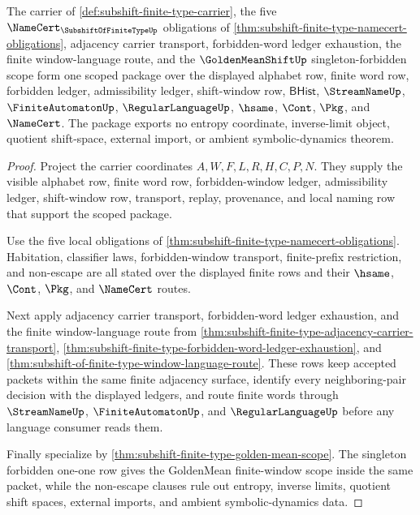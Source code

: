 \begin{theorem}
\label{thm:subshift-finite-type-scoped-obligation-package}
The carrier of \autoref{def:subshift-finite-type-carrier}, the five $\NameCert_{\SubshiftOfFiniteTypeUp}$ obligations of \autoref{thm:subshift-finite-type-namecert-obligations}, adjacency carrier transport, forbidden-word ledger exhaustion, the finite window-language route, and the $\GoldenMeanShiftUp$ singleton-forbidden scope form one scoped package over the displayed alphabet row, finite word row, forbidden ledger, admissibility ledger, shift-window row, $\mathsf{BHist}$, $\StreamNameUp$, $\FiniteAutomatonUp$, $\RegularLanguageUp$, $\hsame$, $\Cont$, $\Pkg$, and $\NameCert$. The package exports no entropy coordinate, inverse-limit object, quotient shift-space, external import, or ambient symbolic-dynamics theorem.
\end{theorem}
\begin{proof}
Project the carrier coordinates $A,W,F,L,R,H,C,P,N$. They supply the visible alphabet row, finite word row, forbidden-window ledger, admissibility ledger, shift-window row, transport, replay, provenance, and local naming row that support the scoped package.

Use the five local obligations of \autoref{thm:subshift-finite-type-namecert-obligations}. Habitation, classifier laws, forbidden-window transport, finite-prefix restriction, and non-escape are all stated over the displayed finite rows and their $\hsame$, $\Cont$, $\Pkg$, and $\NameCert$ routes.

Next apply adjacency carrier transport, forbidden-word ledger exhaustion, and the finite window-language route from \autoref{thm:subshift-finite-type-adjacency-carrier-transport}, \autoref{thm:subshift-finite-type-forbidden-word-ledger-exhaustion}, and \autoref{thm:subshift-of-finite-type-window-language-route}. These rows keep accepted packets within the same finite adjacency surface, identify every neighboring-pair decision with the displayed ledgers, and route finite words through $\StreamNameUp$, $\FiniteAutomatonUp$, and $\RegularLanguageUp$ before any language consumer reads them.

Finally specialize by \autoref{thm:subshift-finite-type-golden-mean-scope}. The singleton forbidden one-one row gives the GoldenMean finite-window scope inside the same packet, while the non-escape clauses rule out entropy, inverse limits, quotient shift spaces, external imports, and ambient symbolic-dynamics data.
\end{proof}

